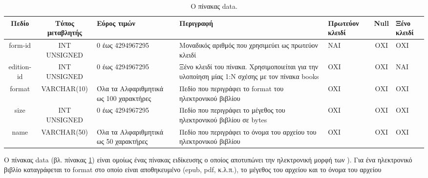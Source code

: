 \documentclass{assignment}
\begin{document}
\begin{landscape}
\begin{table}[htbp]
\begin{center}
  \begin{tabular}{|c|c|m{}|m{}|m{2.0cm}|c|m{1.5cm}|}
    \hline
    {\bf Πεδίο} & {\bf Τύπος μεταβλητής} & {\bf Εύρος τιμών} & {\bf Περιγραφή} & {\bf Πρωτεύον κλειδί} & {\bf Null} & {\bf Ξένο κλειδί} \\ \hline
    form-id & INT UNSIGNED & 0 έως 4294967295 & Μοναδικός αριθμός που χρησιμεύει ως πρωτεύον κλειδί & ΝΑΙ & ΟΧΙ & ΟΧΙ \\ \hline
    edition-id & INT UNSIGNED & 0 έως 4294967295 & Ξένο κλειδί του πίνακα. Χρησιμοποιείται για την υλοποίηση μίας 1:Ν σχέσης με τον πίνακα books & ΟΧΙ & ΟΧΙ & NAI \\ \hline
    format & VARCHAR(10) &  Όλα τα Αλφαριθμητικά ως 100 χαρακτήρες & Πεδίο που περιγράφει το format του ηλεκτρονικού βιβλίου & OXI & ΟΧΙ & ΟΧΙ \\ \hline
    size & INT UNSIGNED & 0 έως 4294967295 & Πεδίο που περιγράφει το μέγεθος του ηλεκτρονικού βιβλίου σε bytes & OXI & ΟΧΙ & ΟΧΙ \\ \hline
    name & VARCHAR(50) &  Όλα τα Αλφαριθμητικά ως 50 χαρακτήρες & Πεδίο που περιγράφει το όνομα του αρχείου του ηλεκτρονικού βιβλίου & OXI & ΟΧΙ & ΟΧΙ \\ \hline
  \end{tabular}
\caption{Ο πίνακας data.}
\label{table:db_table:data}
\end{center}
\end{table}

Ο πίνακας data (βλ. πίνακας \ref{table:db_table:data}) είναι ομοίως ένας πίνακας ειδίκευσης ο οποίος αποτυπώνει την ηλεκτρονική μορφή των ). Για ένα ηλεκτρονικό βιβλίο καταγράφεται το format στο οποίο είναι αποθηκευμένο (epub, pdf, κ.λ.π.), το μέγεθος του αρχείου και το όνομα του αρχείου
\end{landscape}
\end{document}
